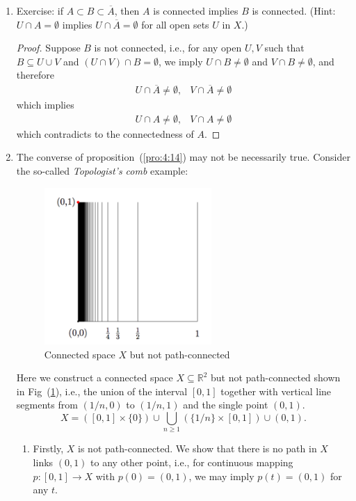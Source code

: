 \begin{example}
\begin{enumerate}
\item
Exercise: if $A\subset B\subset\overline{A}$, then ${A}$ is connected implies $B$ is connected. (Hint: $U\cap A=\emptyset$ implies $U\cap\overline{A}=\emptyset$ for all open sets $U$ in $X$.)
\begin{proof}
Suppose $B$ is not connected, i.e., for any open $U,V$ such that $B\subseteq U\cup V$ and $(U\cap V)\cap B = \emptyset$, we imply $U\cap B\ne\emptyset$ and $V\cap B\ne\emptyset$, and therefore
\[
\begin{array}{ll}
U\cap \overline{A}\ne\emptyset,
&
V\cap \overline{A}\ne\emptyset
\end{array}
\]
which implies
\[
\begin{array}{ll}
U\cap A\ne\emptyset,
&
V\cap A\ne\emptyset
\end{array}
\]
which contradicts to the connectedness of $A$.
\end{proof}
\item
The converse of proposition~(\ref{pro:4:14}) may not be necessarily true. Consider the so-called \emph{Topologist's comb} example:
\begin{figure}[H]
\centering
\includegraphics[width=0.6\textwidth]{week4/p_9}
\caption{Connected space $X$ but not path-connected}
\label{fig:4:1}
\end{figure}
Here we construct a connected space $X\subseteq\mathbb{R}^2$ but not path-connected shown in Fig~(\ref{fig:4:1}), i.e., the union of the interval $[0,1]$ together with vertical line segments from $(1/n,0)$ to $(1/n,1)$ and the single point $(0,1)$.
\[
X = ([0,1]\times\{0\}) \cup \bigcup_{n\ge1}(\{1/n\}\times[0,1])\cup(0,1).
\]
\begin{enumerate}
\item
Firstly, $X$ is not path-connected. We show that there is no path in $X$ links $(0,1)$ to any other point, i.e., for continuous mapping $p:[0,1]\to X$ with $p(0)=(0,1)$, we may imply $p(t)=(0,1)$ for any $t$.


\end{enumerate}
\end{enumerate}
\end{example}
